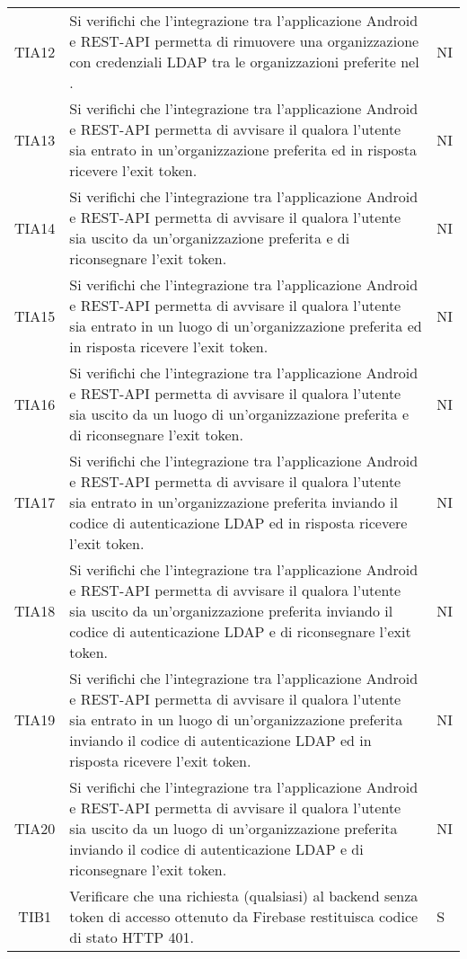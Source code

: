 {\begin{longtable}{ c C{13cm} C{1cm}}
TIA12 & Si verifichi che l’integrazione tra l’applicazione Android e REST-API permetta di rimuovere una organizzazione con credenziali LDAP tra le organizzazioni preferite nel . & NI \\
TIA13 & Si verifichi che l’integrazione tra l’applicazione Android e REST-API permetta di avvisare il  qualora l'utente sia entrato in un'organizzazione preferita ed in risposta ricevere l'exit token. & NI \\
TIA14 & Si verifichi che l’integrazione tra l’applicazione Android e REST-API permetta di avvisare il  qualora l'utente sia uscito da un'organizzazione preferita e di riconsegnare l'exit token. & NI \\
TIA15 & Si verifichi che l’integrazione tra l’applicazione Android e REST-API permetta di avvisare il  qualora l'utente sia entrato in un luogo di un'organizzazione preferita ed in risposta ricevere l'exit token. & NI \\
TIA16 & Si verifichi che l’integrazione tra l’applicazione Android e REST-API permetta di avvisare il  qualora l'utente sia uscito da un luogo di un'organizzazione preferita e di riconsegnare l'exit token. & NI \\
TIA17 & Si verifichi che l’integrazione tra l’applicazione Android e REST-API permetta di avvisare il  qualora l'utente sia entrato in un'organizzazione preferita inviando il codice di autenticazione LDAP ed in risposta ricevere l'exit token. & NI \\
TIA18 & Si verifichi che l’integrazione tra l’applicazione Android e REST-API permetta di avvisare il  qualora l'utente sia uscito da un'organizzazione preferita inviando il codice di autenticazione LDAP e di riconsegnare l'exit token. & NI \\
TIA19 & Si verifichi che l’integrazione tra l’applicazione Android e REST-API permetta di avvisare il  qualora l'utente sia entrato in un luogo di un'organizzazione preferita inviando il codice di autenticazione LDAP ed in risposta ricevere l'exit token. & NI \\
TIA20 & Si verifichi che l’integrazione tra l’applicazione Android e REST-API permetta di avvisare il  qualora l'utente sia uscito da un luogo di un'organizzazione preferita inviando il codice di autenticazione LDAP e di riconsegnare l'exit token. & NI \\
TIB1 & Verificare che una richiesta (qualsiasi) al backend senza token di accesso ottenuto da Firebase restituisca codice di stato HTTP 401. & S \\

\end{longtable}}
